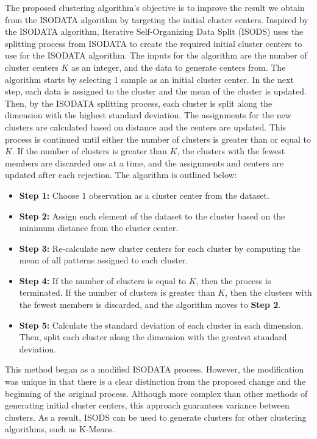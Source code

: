 \documentclass[a4paper,10pt]{article}
\begin{document}
The proposed clustering algorithm's objective is to improve the result we obtain
from the ISODATA algorithm by targeting the initial cluster centers. Inspired by
the ISODATA algorithm, Iterative Self-Organizing Data Split (ISODS) uses the
splitting process from ISODATA to create the required initial cluster centers to
use for the ISODATA algorithm. The inputs for the algorithm are the number of
cluster centers $K$ as an integer, and the data to generate centers from. The
algorithm starts by selecting $1$ sample as an initial cluster center. In the
next step, each data is assigned to the cluster and the mean of the cluster is
updated. Then, by the ISODATA splitting process, each cluster is split along the
dimension with the highest standard deviation. The assignments for the new
clusters are calculated based on distance and the centers are updated. This
process is continued until either the number of clusters is greater than or
equal to $K$. If the number of clusters is greater than $K$, the clusters with
the fewest members are discarded one at a time, and the assignments and centers
are updated after each rejection. The algorithm is outlined below:

\begin{itemize}
      \item \textbf{Step 1:} Choose $1$ observation as a cluster center from the
            dataset.
      \item \textbf{Step 2:} Assign each element of the dataset to the cluster
            based on the minimum distance from the cluster center.
      \item \textbf{Step 3:} Re-calculate new cluster centers for each cluster by
            computing the mean of all patterns assigned to each cluster.
      \item \textbf{Step 4:} If the number of clusters is equal to $K$, then the
            process is terminated. If the number of clusters is greater than $K$,
            then the clusters with the fewest members is discarded, and the
            algorithm moves to \textbf{Step 2}.
      \item \textbf{Step 5:} Calculate the standard deviation of each cluster in
            each dimension. Then, split each cluster along the dimension with the
            greatest standard deviation.
\end{itemize}

This method began as a modified ISODATA process. However, the modification was
unique in that there is a clear distinction from the proposed change and the
beginning of the original process. Although more complex than other methods of
generating initial cluster centers, this approach guarantees variance between
clusters. As a result, ISODS can be used to generate clusters for other
clustering algorithms, such as K-Means.
\end{document}
